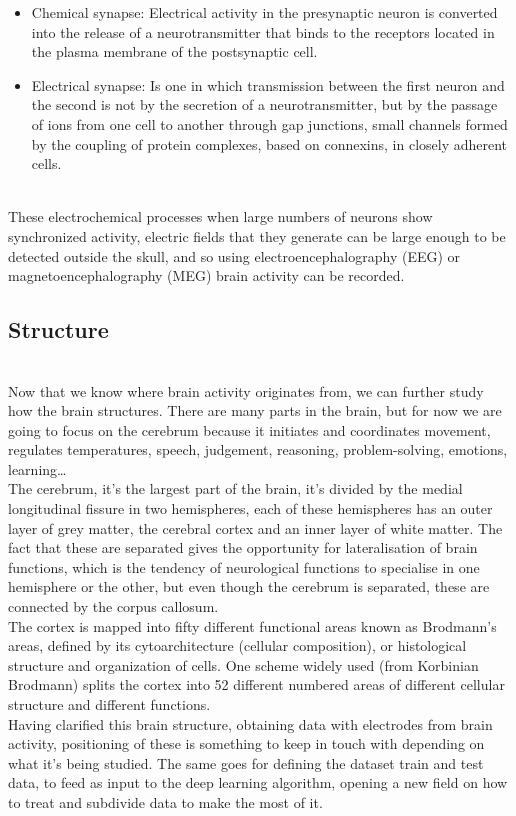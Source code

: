 \begin{itemize}
  \item	Chemical synapse: Electrical activity in the presynaptic neuron is converted into the release of a neurotransmitter that binds to the receptors located in the plasma membrane of the postsynaptic cell.
  \item	Electrical synapse: Is one in which transmission between the first neuron and the second is not by the secretion of a neurotransmitter, but by the passage of ions from one cell to another through gap junctions, small channels formed by the coupling of protein complexes, based on connexins, in closely adherent cells.
\end{itemize}

\leavevmode\\
These electrochemical processes when large numbers of neurons show synchronized activity, electric fields that they generate can be large enough to be detected outside the skull, and so using electroencephalography (EEG) or magnetoencephalography (MEG) brain activity can be recorded.
\\

\subsection{Structure}
\label{subsec-structure}
\leavevmode\\
Now that we know where brain activity originates from, we can further study how the brain structures. There are many parts in the brain, but for now we are going to focus on the cerebrum because it initiates and coordinates movement, regulates temperatures, speech, judgement, reasoning, problem-solving, emotions, learning…
\\
The cerebrum, it’s the largest part of the brain, it’s divided by the medial longitudinal fissure in two hemispheres, each of these hemispheres has an outer layer of grey matter, the cerebral cortex and an inner layer of white matter. The fact that these are separated gives the opportunity for lateralisation of brain functions, which is the tendency of neurological functions to specialise in one hemisphere or the other, but even though the cerebrum is separated, these are connected by the corpus callosum.
\\
The cortex is mapped into fifty different functional areas known as Brodmann’s areas, defined by its cytoarchitecture (cellular composition), or histological structure and organization of cells. One scheme widely used (from Korbinian Brodmann) splits the cortex into 52 different numbered areas of different cellular structure and different functions.
\\
Having clarified this brain structure, obtaining data with electrodes from brain activity, positioning of these is something to keep in touch with depending on what it’s being studied. The same goes for defining the dataset train and test data, to feed as input to the deep learning algorithm, opening a new field on how to treat and subdivide data to make the most of it.
\\